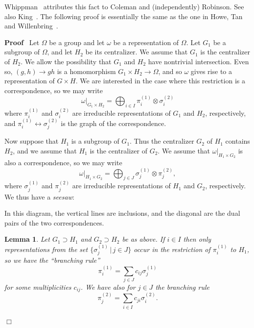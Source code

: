 \documentclass[11pt]{amsart}
\newcommand{\tmem}[1]{{\em #1\/}}
\renewenvironment{proof}{
\noindent\textbf{Proof}\ }{\hspace*{\fill}
\begin{math}\Box\end{math}\medskip}
\newtheorem{lemma}{Lemma}
\begin{document}
{\noindent}Whippman~{\cite{whippman}} attributes this fact to
Coleman and (independently) Robinson. See also
King~{\cite{KingBranching}}. The following proof is essentially
the same as the one in Howe, Tan and
Willenbring~{\cite{HoweTanWillenbring}}.

\medbreak
\begin{proof}  Let $\Omega$ be a group and let $\omega$ be a representation of
$\Omega$. Let $G_1$ be a subgroup of $\Omega$, and let $H_2$ be
its centralizer. We assume that $G_1$ is the centralizer of $H_2$.
We allow the possibility that $G_1$ and $H_2$ have nontrivial
intersection. Even so, $( g, h ) \longrightarrow g h$ is a
homomorphism $G_1 \times H_2 \longrightarrow \Omega$, and so
$\omega$ gives rise to a representation of $G \times H$. We are
interested in the case where this restriction is a correspondence,
so we may write
\[ \omega |_{G_1 \times H_2} = \bigoplus_{i \in I} \pi_i^{( 1 )} \otimes
    \sigma_i^{( 2 )} \]
where $\pi_i^{( 1 )}$ and $\sigma_i^{( 2 )}$ are irreducible
representations of $G_1$ and $H_2$, respectively, and $\pi_i^{( 1
)} \longleftrightarrow \sigma_j^{( 2 )}$ is the graph of the
correspondence.

Now suppose that $H_1$ is a subgroup of $G_1$. Thus the
centralizer $G_2$ of $H_1$ contains $H_2$, and we assume that
$H_1$ is the centralizer of $G_2$. We assume that $\omega |_{H_1
\times G_2}$ is also a correspondence, so we may write
\[ \omega |_{H_1 \times G_2} = \bigoplus_{j \in J} \sigma_j^{( 1 )} \otimes
    \pi_j^{( 2 )}, \]
where $\sigma_j^{( 1 )}$ and $\pi_j^{( 2 )}$ are irreducible
representations of $H_1$ and $G_2$, respectively. We thus have a
{\tmem{seesaw}}:

{\hspace*{\fill}}  {\hspace*{\fill}}

In this diagram, the vertical lines are inclusions, and the
diagonal are the dual pairs of the two correspondences.

\begin{lemma}
   \label{ratioshoweduality}Let $G_1 \supset H_1$ and $G_2 \supset H_2$ be as
   above. If $i \in I$ then only representations from the set $\{ \sigma_j^{(
   1 )} \, | \, j \in J \}$ occur in the restriction of $\pi_i^{( 1 )}$ to
   $H_1$, so we have the ``branching rule''
   \begin{equation}
     \label{ratiosleftbranch} \pi_i^{( 1 )} = \sum_{j \in J} c_{i j}
     \sigma_j^{( 1 )}
   \end{equation}
   for some multiplicities $c_{i j}$. We have also for $j \in J$ the
   branching rule
   \[ \pi_j^{( 2 )} = \sum_{i \in I} c_{j i} \sigma_i^{( 2 )} . \]
\end{lemma}


\end{proof}
\end{document}
